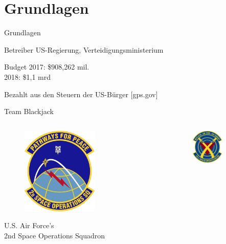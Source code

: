 \section{Grundlagen}
\begin{frame}{Grundlagen}
    \begin{block}{Betreiber}
        US-Regierung, Verteidigungsministerium
    \end{block}
    \begin{block}{Budget}
        2017: \$908,262 mil.\\
        2018: \$1,1 mrd
    \end{block}
    Bezahlt aus den Steuern der US-Bürger {\small [gps.gov]}
\end{frame}

\begin{frame}{Team Blackjack}
    \begin{columns}
        \begin{column}{0.5\textwidth}
            \begin{figure}
                \centering
                \includegraphics[width=0.6\textwidth]{images/2sops.PNG}
            \end{figure}
            U.S. Air Force's\\
            2nd Space Operations Squadron
        \end{column}
        \begin{column}{0.5\textwidth}
            \begin{figure}
                \centering
                \includegraphics[width=0.6\textwidth]{images/19sops.JPG}

\end{figure}
\end{column}
\end{columns}
\end{frame}
